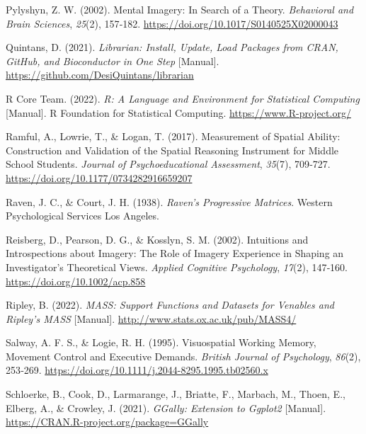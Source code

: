 \documentclass[
  12pt,
]{article}
\newlength{\cslhangindent}
\newlength{\cslentryspacingunit} %
\newenvironment{CSLReferences}[2] %
 {%
  \setlength{\parindent}{0pt}
  \ifodd #1
  \let\oldpar\par
  \def\par{\hangindent=\cslhangindent\oldpar}
  \fi
  \setlength{\parskip}{#2\cslentryspacingunit}
 }%
 {}
\begin{document}
\begin{CSLReferences}{1}{0}
\leavevmode{}%
Pylyshyn, Z. W. (2002). Mental Imagery: {In} Search of a Theory.
\emph{Behavioral and Brain Sciences}, \emph{25}(2), 157‑182.
\url{https://doi.org/10.1017/S0140525X02000043}

\leavevmode{}%
Quintans, D. (2021). \emph{Librarian: {Install}, Update, Load Packages
from {CRAN}, {GitHub}, and Bioconductor in One Step} {[}Manual{]}.
\url{https://github.com/DesiQuintans/librarian}

\leavevmode{}%
R Core Team. (2022). \emph{R: {A} Language and Environment for
Statistical Computing} {[}Manual{]}. {R Foundation for Statistical
Computing}. \url{https://www.R-project.org/}

\leavevmode{}%
Ramful, A., Lowrie, T., \& Logan, T. (2017). Measurement of {Spatial
Ability}: {Construction} and {Validation} of the {Spatial Reasoning
Instrument} for {Middle School Students}. \emph{Journal of
Psychoeducational Assessment}, \emph{35}(7), 709‑727.
\url{https://doi.org/10.1177/0734282916659207}

\leavevmode{}%
Raven, J. C., \& Court, J. H. (1938). \emph{Raven's Progressive
Matrices}. {Western Psychological Services Los Angeles}.

\leavevmode{}%
Reisberg, D., Pearson, D. G., \& Kosslyn, S. M. (2002). Intuitions and
Introspections about Imagery: The Role of Imagery Experience in Shaping
an Investigator's Theoretical Views. \emph{Applied Cognitive
Psychology}, \emph{17}(2), 147‑160.
\url{https://doi.org/10.1002/acp.858}

\leavevmode{}%
Ripley, B. (2022). \emph{{MASS}: {Support} Functions and Datasets for
Venables and Ripley's {MASS}} {[}Manual{]}.
\url{http://www.stats.ox.ac.uk/pub/MASS4/}

\leavevmode{}%
Salway, A. F. S., \& Logie, R. H. (1995). Visuospatial Working Memory,
Movement Control and Executive Demands. \emph{British Journal of
Psychology}, \emph{86}(2), 253‑269.
\url{https://doi.org/10.1111/j.2044-8295.1995.tb02560.x}

\leavevmode{}%
Schloerke, B., Cook, D., Larmarange, J., Briatte, F., Marbach, M.,
Thoen, E., Elberg, A., \& Crowley, J. (2021). \emph{{GGally}:
{Extension} to Ggplot2} {[}Manual{]}.
\url{https://CRAN.R-project.org/package=GGally}


\end{CSLReferences}
\end{document}
